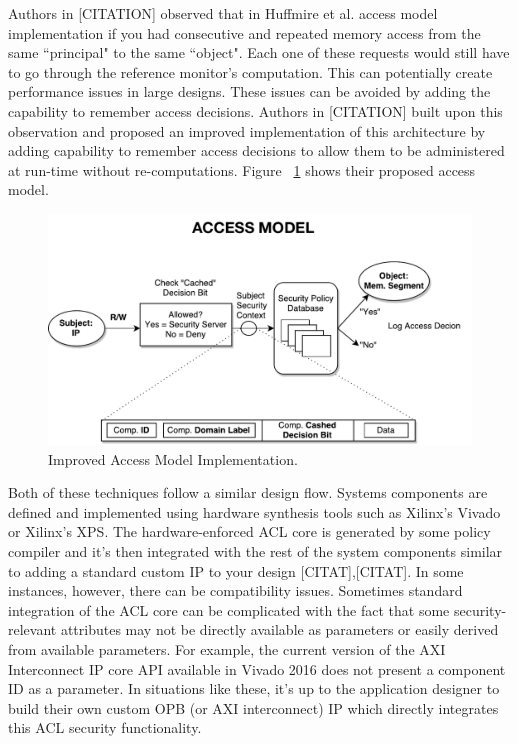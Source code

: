 \documentclass[sigconf]{acmart}
\theoremstyle{plain}
\theoremstyle{remark}
\begin{document}
Authors in [CITATION] observed that in Huffmire et al. access model implementation if you had consecutive and repeated memory access from the same ``principal" to the same ``object". Each one of these requests would still have to go through the reference monitor's computation. This can potentially create performance issues in large designs. These issues can be avoided by adding the capability to remember access decisions. Authors in [CITATION] built upon this observation and proposed an improved implementation of this architecture by adding capability to remember access decisions to allow them to be administered at run-time without re-computations. Figure ~\ref{fig:access} shows their proposed access model.

\begin{figure}[hbt]
\centering
\includegraphics[width=1\columnwidth]{figures/access.pdf}
\caption{Improved Access Model Implementation.} %
\label{fig:access}
\end{figure}

Both of these techniques follow a similar design flow. Systems components are defined and implemented using hardware synthesis tools such as Xilinx's Vivado or Xilinx's XPS.  The hardware-enforced ACL core is generated by some policy compiler and it's then integrated with the rest of the system components similar to adding a standard custom IP to your design [CITAT],[CITAT]. In some instances, however, there can be compatibility issues. Sometimes standard integration of the ACL core can be complicated with the fact that some security-relevant attributes may not be directly available as parameters or easily derived from available parameters. For example, the current version of the AXI Interconnect IP core API available in Vivado 2016 does not present a component ID as a parameter. In situations like these, it's up to the application designer to build their own custom OPB (or AXI interconnect) IP which directly integrates this ACL security functionality.
\end{document}
